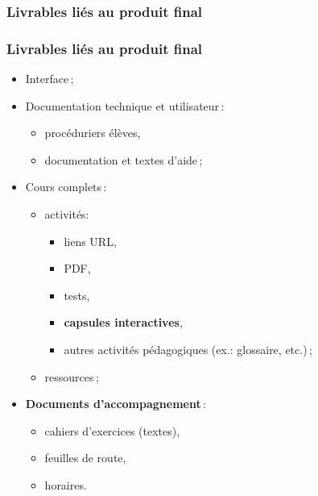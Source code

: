 					\subsubsection{Livrables liés au produit final} 
							\begin{frame}[allowframebreaks]
							\frametitle{Livrables liés au produit final}
                        			
							\begin{itemize}
							\item Interface\,;
							\item Documentation technique et utilisateur\,:
								\begin{itemize}
								\item procéduriers élèves,
								\item documentation et textes d’aide\,;
								\end{itemize}
							\item Cours complets\,:
								\begin{itemize}
								\item activités:
									\begin{itemize}
									\item liens URL,
									\item PDF,
									\item tests,
									\item \textbf{capsules interactives},
									\item autres activités pédagogiques (ex.: glossaire, etc.)\,;
									\end{itemize}
								\framebreak
								\item ressources\,;
									
								\end{itemize}
							\item \textbf{Documents d'accompagnement}\,:
								\begin{itemize}
								\item cahiers d’exercices (textes),
								\item feuilles de route,
								\item horaires.
								\end{itemize}
							\end{itemize}						
					\end{frame}
					
